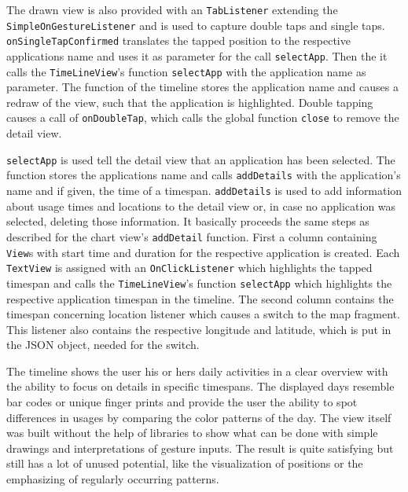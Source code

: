 The  drawn view is also provided with an \lstinline$TabListener$ extending the \lstinline$SimpleOnGestureListener$ and is used to capture double taps and single taps. \lstinline$onSingleTapConfirmed$ translates the tapped position to the respective applications name and uses it as parameter for the call \lstinline$selectApp$. Then the it calls the \lstinline$TimeLineView$'s function \lstinline$selectApp$ with the application name as parameter. The function of the timeline stores the application name and causes a redraw of the view, such that the application is highlighted. Double tapping causes a call of \lstinline$onDoubleTap$, which calls the global function \lstinline$close$ to remove the detail view.

\lstinline$selectApp$  is used tell the detail view that an application has been selected. The function stores the applications name and calls \lstinline$addDetails$ with the application's name and if given, the time of a timespan. \lstinline$addDetails$ is used to add information about usage times and locations to the detail view or, in case no application was selected, deleting those information. It basically proceeds the same steps as described for the chart view's \lstinline$addDetail$ function. First a column containing \lstinline$View$s with start time and duration for the respective application is created. Each \lstinline$TextView$ is assigned with an \lstinline$OnClickListener$ which highlights the tapped timespan and calls the \lstinline$TimeLineView$'s function \lstinline$selectApp$ which highlights the respective application timespan in the timeline. The second column contains the timespan concerning location listener which causes a switch to the map fragment. This listener also contains the respective longitude and latitude, which is put in the JSON object, needed for the switch.

The timeline shows the user his or hers daily activities in a clear overview with the ability to focus on details in specific timespans. The displayed days resemble bar codes or unique finger prints and provide the user the ability to spot differences in usages by comparing the color patterns of the day. The view itself was built without the help of libraries to show what can be done with simple drawings and interpretations of gesture inputs. The result is quite satisfying but still has a lot of unused potential, like the visualization of positions or the emphasizing of regularly occurring patterns.